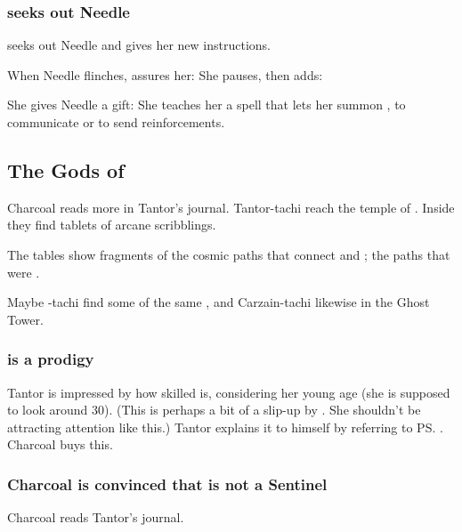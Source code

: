 \subsubsection{\Achsah{} seeks out Needle}
 seeks out Needle and gives her new instructions. 

When Needle flinches, \Achsah{} assures her: 
She pauses, then adds: 

She gives Needle a gift: She teaches her a spell that lets her summon \Achsah{}, to communicate or to send reinforcements. 







\subsection{The Gods of \EreshKal}
Charcoal reads more in Tantor's journal. Tantor-tachi reach the temple of \Rungertemple. Inside they find tablets of arcane scribblings. 

The tables show fragments of the cosmic paths that connect \Miith{} and \Machai; the paths that were . 

Maybe \Shilred-tachi find some of the same , and Carzain-tachi likewise in the Ghost Tower. 





\subsubsection{\Takestsha{} is a prodigy}
Tantor is impressed by how skilled \Takestsha{} is, considering her young age (she is supposed to look around 30). (This is perhaps a bit of a slip-up by \Nzessuacrith. She shouldn't be attracting attention like this.) 
Tantor explains it to himself by referring to \ps{\Takestsha} . Charcoal buys this. 





\subsubsection{Charcoal is convinced that \Takestsha{} is not a Sentinel}
Charcoal reads Tantor's journal. 

